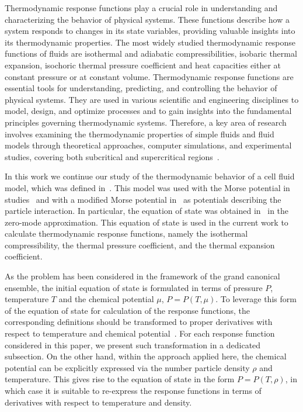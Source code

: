 \documentclass[fleqn,twoside,twocolumn,nofootinbib,showkeys]{revtex4} %
\begin{document}
	Thermodynamic response functions play a crucial role in understanding and characterizing the behavior of physical systems. These functions describe how a system responds to changes in its state variables, providing valuable insights into its thermodynamic properties. The most widely studied thermodynamic response functions of fluids are isothermal and adiabatic compressibilities, isobaric thermal expansion, isochoric thermal pressure coefficient and heat capacities either at constant pressure or at constant volume. Thermodynamic response functions are essential tools for understanding, predicting, and controlling the behavior of physical systems. They are used in various scientific and engineering disciplines to model, design, and optimize processes and to gain insights into the fundamental principles governing thermodynamic systems. Therefore, a key area of research involves examining the thermodynamic properties of simple fluids and fluid models through theoretical approaches, computer simulations, and experimental studies, covering both subcritical and supercritical regions~\cite{Johnston2014book,YigzaweSadus2013,Velasco2011,Bulavin2024}. 
	
	
	In this work we continue our study of the thermodynamic behavior of a cell fluid model, which was defined in~\cite{KozitskyKozlovskiiDobush2018book,KozitskyKozlovskiiDobush2020}. This model was used with the Morse potential in studies~\cite{PylyukEtAlJML2023,PylyukKozlovskiiDobushUJP2023b} and with a modified Morse potential in~\cite{KozlovskiiDobush2020,PylyukDobush2020} as potentials describing the particle interaction. In particular, the equation of state was obtained in~\cite{KozlovskiiDobush2020} in the zero-mode approximation. This equation of state is used in the current work to calculate thermodynamic response functions, namely the isothermal compressibility, the thermal pressure coefficient, and the thermal expansion coefficient. 
	
	As the problem has been considered in the framework of the grand canonical ensemble, the initial equation of state is formulated in terms of pressure $P$, temperature $T$ and the chemical potential $\mu$, $P = P(T,\mu)$. To leverage this form of the equation of state for calculation of the response functions, the corresponding definitions should be transformed to proper derivatives with respect to temperature and chemical potential~\cite{StrokerMeier2021}. For each response function considered in this paper, we present such transformation in a dedicated subsection. On the other hand, within the approach applied here, the chemical potential can be explicitly expressed via the number particle density $\rho$ and temperature. This gives rise to the equation of state in the form $P = P(T, \rho)$, in which case it is suitable to re-express the response functions in terms of derivatives with respect to temperature and density.
	
\end{document}
